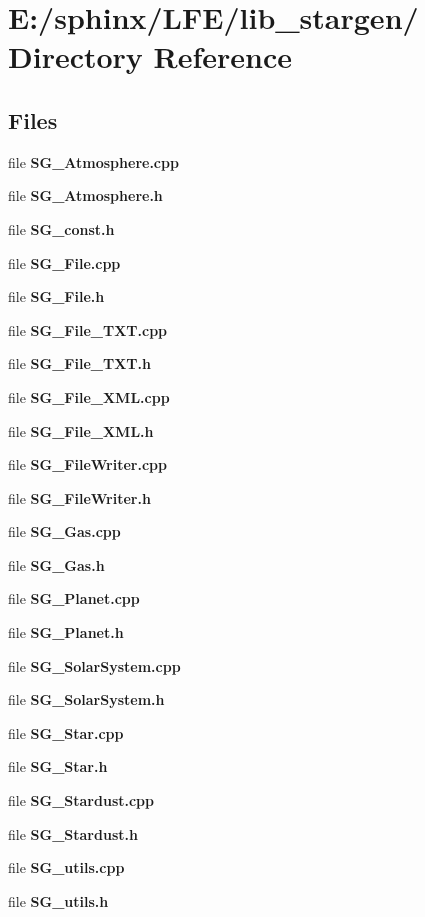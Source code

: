 \section{E:/sphinx/LFE/lib\_\-stargen/ Directory Reference}
\label{dir_000003}
\subsection*{Files}
\begin{CompactItemize}
\item 
file {\bf SG_Atmosphere.cpp}
\item 
file {\bf SG_Atmosphere.h}
\item 
file {\bf SG_const.h}
\item 
file {\bf SG_File.cpp}
\item 
file {\bf SG_File.h}
\item 
file {\bf SG_File_TXT.cpp}
\item 
file {\bf SG_File_TXT.h}
\item 
file {\bf SG_File_XML.cpp}
\item 
file {\bf SG_File_XML.h}
\item 
file {\bf SG_FileWriter.cpp}
\item 
file {\bf SG_FileWriter.h}
\item 
file {\bf SG_Gas.cpp}
\item 
file {\bf SG_Gas.h}
\item 
file {\bf SG_Planet.cpp}
\item 
file {\bf SG_Planet.h}
\item 
file {\bf SG_SolarSystem.cpp}
\item 
file {\bf SG_SolarSystem.h}
\item 
file {\bf SG_Star.cpp}
\item 
file {\bf SG_Star.h}
\item 
file {\bf SG_Stardust.cpp}
\item 
file {\bf SG_Stardust.h}
\item 
file {\bf SG_utils.cpp}
\item 
file {\bf SG_utils.h}
\end{CompactItemize}
